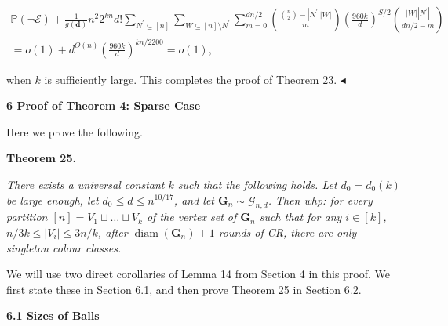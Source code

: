 \documentclass[10pt,a4paper]{article}
\begin{document}
\[\begin{gathered}
\mathbb{P}(\neg\mathcal{E})+\frac{1}{g(\mathbf{d})}n^{2}2^{kn}d!\sum_{N^{\prime}\subseteq[n]}\sum_{W\subseteq[n]\setminus N^{\prime}}\sum_{m=0}^{dn/2}\binom{\binom{n}{2}-|N^{\prime}||W|}{m}\left(\frac{960k}{d}\right)^{S/2}\binom{|W||N^{\prime}|}{dn/2-m}\\
=o(1)+d^{\Theta(n)}\left(\frac{960k}{d}\right)^{kn/2200}=o(1),
\end{gathered}\]


when $k$ is sufficiently large. This completes the proof of Theorem 23.
$\blacktriangleleft$\par






\par\medskip\noindent\textbf{
6 Proof of Theorem 4: Sparse Case}\par




Here we prove the following.\par





\par\medskip\noindent\textbf{
\textbf{Theorem 25}\textbf{.}
}\par



\emph{There exists a universal constant $k$ such that the following holds. Let $d_{0}=d_{0}(k)$ be large enough, let $d_{0}\leq d\leq n^{10/17}$, and let $\mathbf{G}_{n}\sim\mathcal{G}_{n,d}$.
Then whp: for every partition $[n]=V_{1}\sqcup\ldots\sqcup V_{k}$ of the vertex set of $\mathbf{G}_{n}$ such that for any $i\in[k]$, $n/3k\leq|V_{i}|\leq 3n/k$, after $\operatorname{diam}(\mathbf{G}_{n})+1$ rounds of CR, there are only singleton colour classes.}\par






We will use two direct corollaries of Lemma 14 from Section 4 in this proof. We first state these in Section 6.1, and then prove Theorem 25 in Section 6.2.\par




\par\medskip\noindent\textbf{
6.1 Sizes of Balls}\par
\end{document}
